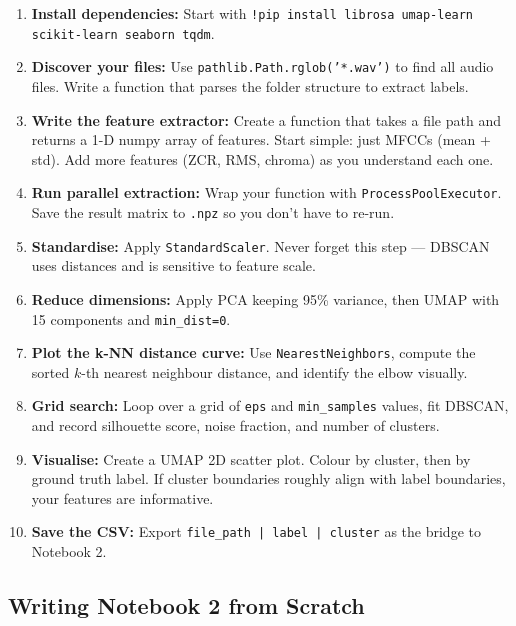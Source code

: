 \documentclass[12pt,a4paper]{article}
\begin{document}
\begin{enumerate}
  \item \textbf{Install dependencies:} Start with \texttt{!pip install librosa umap-learn scikit-learn seaborn tqdm}.

  \item \textbf{Discover your files:} Use \texttt{pathlib.Path.rglob('*.wav')} to find all audio files. Write a function that parses the folder structure to extract labels.

  \item \textbf{Write the feature extractor:} Create a function that takes a file path and returns a 1-D numpy array of features. Start simple: just MFCCs (mean + std). Add more features (ZCR, RMS, chroma) as you understand each one.

  \item \textbf{Run parallel extraction:} Wrap your function with \texttt{ProcessPoolExecutor}. Save the result matrix to \texttt{.npz} so you don't have to re-run.

  \item \textbf{Standardise:} Apply \texttt{StandardScaler}. Never forget this step --- DBSCAN uses distances and is sensitive to feature scale.

  \item \textbf{Reduce dimensions:} Apply PCA keeping 95\% variance, then UMAP with 15 components and \texttt{min\_dist=0}.

  \item \textbf{Plot the k-NN distance curve:} Use \texttt{NearestNeighbors}, compute the sorted $k$-th nearest neighbour distance, and identify the elbow visually.

  \item \textbf{Grid search:} Loop over a grid of \texttt{eps} and \texttt{min\_samples} values, fit DBSCAN, and record silhouette score, noise fraction, and number of clusters.

  \item \textbf{Visualise:} Create a UMAP 2D scatter plot. Colour by cluster, then by ground truth label. If cluster boundaries roughly align with label boundaries, your features are informative.

  \item \textbf{Save the CSV:} Export \texttt{file\_path | label | cluster} as the bridge to Notebook 2.
\end{enumerate}

\subsection{Writing Notebook 2 from Scratch}
\end{document}
